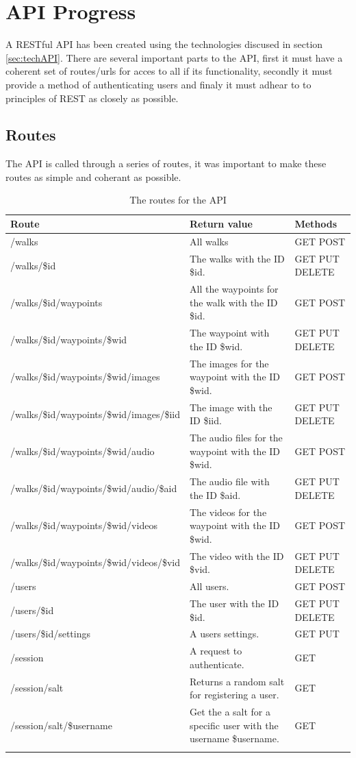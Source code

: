 \documentclass[11pt,a4paper]{article}
\begin{document}
\section{API Progress}

A RESTful API has been created using the technologies discused in section \ref{sec:techAPI}. There are several important parts to the API, first it must have a coherent set of routes/urls for acces to all if its functionality, secondly it must provide a method of authenticating users and finaly it must adhear to to principles of REST as closely as possible. 

\subsection{Routes}

The API is called through a series of routes, it was important to make these routes as simple and coherant as possible.

\begin{longtable}{m{}|m{}|C{0.11\textwidth}}
    \textbf{Route} & \textbf{Return value} & \textbf{Methods} \\\hline
    /walks & All walks & GET POST\\ \hline
    /walks/\$id & The walks with the ID \$id. & GET PUT DELETE\\ \hline
    /walks/\$id/waypoints & All the waypoints for the walk with the ID \$id. & GET POST\\ \hline
    /walks/\$id/waypoints/\$wid & The waypoint with the ID \$wid. & GET PUT DELETE \\ \hline
    /walks/\$id/waypoints/\$wid/images & The images for the waypoint with the ID \$wid. & GET POST \\ \hline
    /walks/\$id/waypoints/\$wid/images/\$iid & The image with the ID \$iid. & GET PUT DELETE \\ \hline
    /walks/\$id/waypoints/\$wid/audio & The audio files for the waypoint with the ID \$wid. & GET POST \\ \hline
    /walks/\$id/waypoints/\$wid/audio/\$aid & The audio file with the ID \$aid. & GET PUT DELETE \\ \hline
    /walks/\$id/waypoints/\$wid/videos & The videos for the waypoint with the ID \$wid. & GET POST \\ \hline
    /walks/\$id/waypoints/\$wid/videos/\$vid & The video with the ID \$vid. & GET PUT DELETE \\ \hline
    /users & All users. & GET POST \\\hline
    /users/\$id & The user with the ID \$id. & GET PUT DELETE \\\hline
    /users/\$id/settings & A users settings. & GET PUT \\\hline
    /session & A request to authenticate. & GET\\\hline
    /session/salt & Returns a random salt for registering a user. & GET\\\hline
    /session/salt/\$username & Get the a salt for a specific user with the username \$username. & GET\\
    \caption {The routes for the API}
    \label{routes}
\end{longtable}
\end{document}
